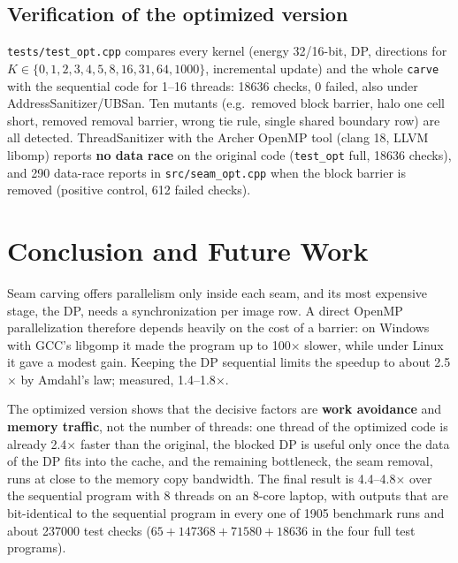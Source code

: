 \documentclass[11pt,a4paper]{article}
\newcommand{\x}{\ensuremath{\times}}
\begin{document}
\subsection{Verification of the optimized version}
\label{sec:verify}
\texttt{tests/test\_opt.cpp} compares every kernel (energy 32/16-bit, DP, directions for
$K\in\{0,1,2,3,4,5,8,16,31,64,1000\}$, incremental update) and the whole \texttt{carve} with the
sequential code for 1--16 threads: \num{18636} checks, 0 failed, also under AddressSanitizer/UBSan. Ten
mutants (e.g.\ removed block barrier, halo one cell short, removed removal barrier, wrong tie rule, single
shared boundary row) are all detected. ThreadSanitizer with the Archer OpenMP tool (clang 18, LLVM libomp)
reports \textbf{no data race} on the original code (\texttt{test\_opt} full, \num{18636} checks), and 290
data-race reports in \texttt{src/seam\_opt.cpp} when the block barrier is removed (positive control, 612
failed checks).

\section{Conclusion and Future Work}

Seam carving offers parallelism only inside each seam, and its most expensive stage, the DP, needs a
synchronization per image row. A direct OpenMP parallelization therefore depends heavily on the cost of a
barrier: on Windows with GCC's libgomp it made the program up to 100\x{} slower, while under Linux it gave
a modest gain. Keeping the DP sequential limits the speedup to about 2.5\x{} by Amdahl's law; measured,
1.4--1.8\x.

The optimized version shows that the decisive factors are \textbf{work avoidance} and \textbf{memory
traffic}, not the number of threads: one thread of the optimized code is already 2.4\x{} faster than the
original, the blocked DP is useful only once the data of the DP fits into the cache, and the remaining
bottleneck, the seam removal, runs at close to the memory copy bandwidth. The final result is
4.4--4.8\x{} over the sequential program with 8 threads on an 8-core laptop, with outputs that are
bit-identical to the sequential program in every one of \num{1905} benchmark runs and about \num{237000}
test checks ($65+\num{147368}+\num{71580}+\num{18636}$ in the four full test programs).
\end{document}
